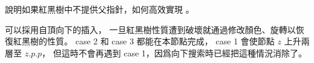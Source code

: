 \startEXERCISE[exercise:13.3-6]
說明如果紅黑樹中不提供父指針，如何高效實現 。
\stopEXERCISE

\startANSWER
可以採用自頂向下的插入，
一旦紅黑樹性質遭到破壞就通過修改顏色、旋轉以恢復紅黑樹的性質。
 case 2 和 case 3 都能在本節點完成，
 case 1 會使節點 $z$ 上升兩層至 $z.p.p$，
但這時不會再遇到 case 1，因爲向下搜索時已經把這種情況消除了。
\stopANSWER
